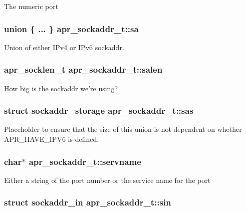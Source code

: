 The numeric port \hypertarget{structapr__sockaddr__t_a3ca40eae640100e0f157e7c21b33a17d}{
\subsubsection[{sa}]{\setlength{\rightskip}{0pt plus 5cm}union \{ ... \}   apr\-\_\-sockaddr\-\_\-t\-::sa}}\label{structapr__sockaddr__t_a3ca40eae640100e0f157e7c21b33a17d}
Union of either I\-Pv4 or I\-Pv6 sockaddr. \hypertarget{structapr__sockaddr__t_aef1d2a482f85eeab7b6bf0a7732a087a}{
\subsubsection[{salen}]{\setlength{\rightskip}{0pt plus 5cm}apr\-\_\-socklen\-\_\-t apr\-\_\-sockaddr\-\_\-t\-::salen}}\label{structapr__sockaddr__t_aef1d2a482f85eeab7b6bf0a7732a087a}
How big is the sockaddr we're using? \hypertarget{structapr__sockaddr__t_ac823daa30be02ee1589b4b67615cef5f}{
\subsubsection[{sas}]{\setlength{\rightskip}{0pt plus 5cm}struct sockaddr\-\_\-storage apr\-\_\-sockaddr\-\_\-t\-::sas}}\label{structapr__sockaddr__t_ac823daa30be02ee1589b4b67615cef5f}
Placeholder to ensure that the size of this union is not dependent on whether A\-P\-R\-\_\-\-H\-A\-V\-E\-\_\-\-I\-P\-V6 is defined. \hypertarget{structapr__sockaddr__t_a668335161a8347b9a34c600bff80b52f}{
\subsubsection[{servname}]{\setlength{\rightskip}{0pt plus 5cm}char$\ast$ apr\-\_\-sockaddr\-\_\-t\-::servname}}\label{structapr__sockaddr__t_a668335161a8347b9a34c600bff80b52f}
Either a string of the port number or the service name for the port \hypertarget{structapr__sockaddr__t_a7d5cf0290260c3c448360fc819b28714}{
\subsubsection[{sin}]{\setlength{\rightskip}{0pt plus 5cm}struct sockaddr\-\_\-in apr\-\_\-sockaddr\-\_\-t\-::sin}}\label{structapr__sockaddr__t_a7d5cf0290260c3c448360fc819b28714}
